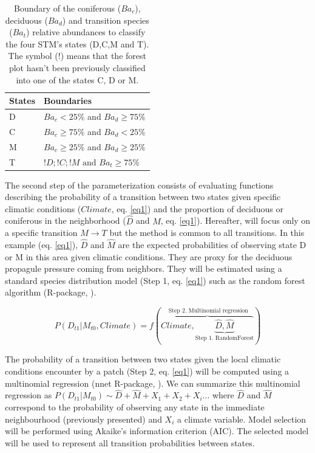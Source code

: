 \begin{table}[h]
\vspace{-1em}
\centering
\caption{Boundary of the coniferous ($Ba_c$), deciduous ($Ba_d$) and transition species ($Ba_t$) relative abundances to classify the four STM's states (D,C,M and T). The symbol ($!$) means that the forest plot hasn't been previously classified into one of the states C, D or M.}
\vspace{-1em}
\small
\begin{tabular}{|l|l|}
	\hline
	\textbf{States}  & \textbf{Boundaries}                            \\
	\hline
	D & $Ba_c< 25\%$ and $Ba_d \geq 75\%$    \\
	C & $Ba_c \geq 75\%$ and $Ba_d < 25\%$    \\
	M & $Ba_c \geq 25\%$ and $Ba_d \geq 25\%$ \\
	T & $!D;!C;!M \text{ and }  Ba_t  \geq 75\%$ \\
	\hline                               
\end{tabular}

\label{bound}
\end{table}

The second step of the parameterization consists of evaluating functions
describing the probability of a transition between two states given specific
climatic conditions ($Climate$, eq. \ref{eq1}) and the proportion of deciduous
or coniferous in the neighborhood ($\hat{D}$ and $\hat{M}$, eq. \ref{eq1}).
Hereafter, will focus only on a specific transition $M \rightarrow T$ but the
method is common to  all transitions. In this example (eq.
\ref{eq1}),  $\hat{D}$ and $\hat{M}$ are the expected probabilities of
observing state D or M in this area given climatic conditions. They are proxy
for the deciduous propagule pressure coming from neighbors. They will be
estimated using  a standard species distribution model (Step 1, eq. \ref{eq1})
such as the random forest algorithm (R-package, \cite{Liaw2002a}).

\begin{equation}
	P(D_{t1}|M_{t0}, Climate) = f(\overbrace{Climate, \underbrace{\hat{D}, \hat{M}}_\text{Step 1. RandomForest}}^\text{ Step 2. Multinomial regression})
\label{eq1}
\end{equation}

The probability of a transition between two states given the local climatic
conditions encounter by a patch (Step 2, eq. \ref{eq1}) will be computed using a multinomial
regression (nnet R-package, \cite{Venables2002}). We can summarize this
multinomial regression as $P(D_{t1}|M_{t0}) \sim \hat{D} + \hat{M} +
X_1+X_2+X_i... $ where $\hat{D}$ and $\hat{M}$ correspond to the probability
of observing any state in the immediate neighbourhood (previously presented)
and $X_i$ a climate variable. Model selection will be performed using Akaike's
information criterion (AIC). The selected model will be used to represent all
transition probabilities between states.   \\

